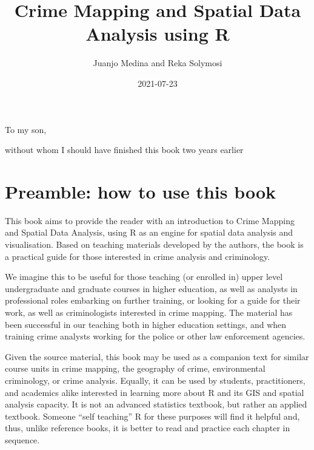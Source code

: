\documentclass[
  krantz2]{krantz}
\title{Crime Mapping and Spatial Data Analysis using R}
\author{Juanjo Medina and Reka Solymosi}
\date{2021-07-23}
\begin{document}
\maketitle


\thispagestyle{empty}

\begin{center}
To my son,

without whom I should have finished this book two years earlier
\end{center}

\setlength{\abovedisplayskip}{-5pt}
\setlength{\abovedisplayshortskip}{-5pt}

{
\hypersetup{linkcolor=}
\setcounter{tocdepth}{2}
\tableofcontents
}
\listoftables
\listoffigures
\hypertarget{preamble-how-to-use-this-book}{%
\chapter{Preamble: how to use this book}\label{preamble-how-to-use-this-book}}

This book aims to provide the reader with an introduction to Crime Mapping and Spatial Data Analysis, using R as an engine for spatial data analysis and visualisation. Based on teaching materials developed by the authors, the book is a practical guide for those interested in crime analysis and criminology.

We imagine this to be useful for those teaching (or enrolled in) upper level undergraduate and graduate courses in higher education, as well as analysts in professional roles embarking on further training, or looking for a guide for their work, as well as criminologists interested in crime mapping. The material has been successful in our teaching both in higher education settings, and when training crime analysts working for the police or other law enforcement agencies.

Given the source material, this book may be used as a companion text for similar course units in crime mapping, the geography of crime, environmental criminology, or crime analysis. Equally, it can be used by students, practitioners, and academics alike interested in learning more about R and its GIS and spatial analysis capacity. It is not an advanced statistics textbook, but rather an applied textbook. Someone ``self teaching'' R for these purposes will find it helpful and, thus, unlike reference books, it is better to read and practice each chapter in sequence.
\end{document}
